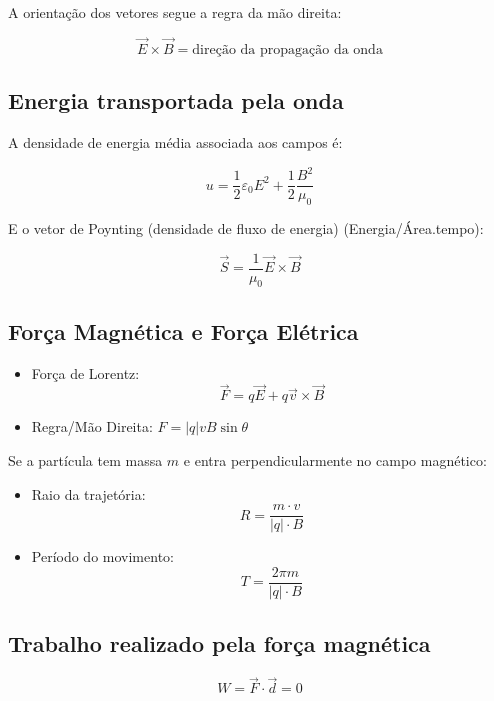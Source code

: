 \documentclass[a4paper,12pt]{article}
\begin{document}
\begin{multicols}{2}
A orientação dos vetores segue a regra da mão direita:

\[
\vec{E} \times \vec{B} = \text{direção da propagação da onda}
\]

\subsection*{Energia transportada pela onda}

A densidade de energia média associada aos campos é:

\[
u = \frac{1}{2} \varepsilon_0 E^2 + \frac{1}{2} \frac{B^2}{\mu_0}
\]

E o vetor de Poynting (densidade de fluxo de energia) (Energia/Área.tempo):

\[
\vec{S} = \frac{1}{\mu_0} \vec{E} \times \vec{B}
\]

\subsection{Força Magn\'etica e Força El\'etrica}

\begin{itemize}
    \item For\c{c}a de Lorentz:
    \[
        \vec{F} = q\vec{E} + q \vec{v} \times \vec{B}
    \]

    \item Regra/M\~ao Direita: $ F = |q| v B \sin\theta$
\end{itemize}

Se a partícula tem massa $m$ e entra perpendicularmente no campo magnético:

\begin{itemize}
    \item Raio da trajetória:
    \begin{equation*}
        R = \frac{m \cdot v}{|q| \cdot B}
    \end{equation*}

    \item Período do movimento:
    \begin{equation*}
        T = \frac{2\pi m}{|q| \cdot B}
    \end{equation*}
\end{itemize}

\subsection{Trabalho realizado pela força magnética}
\begin{equation*}
    W = \vec{F} \cdot \vec{d} = 0
\end{equation*}


\end{multicols}
\end{document}

